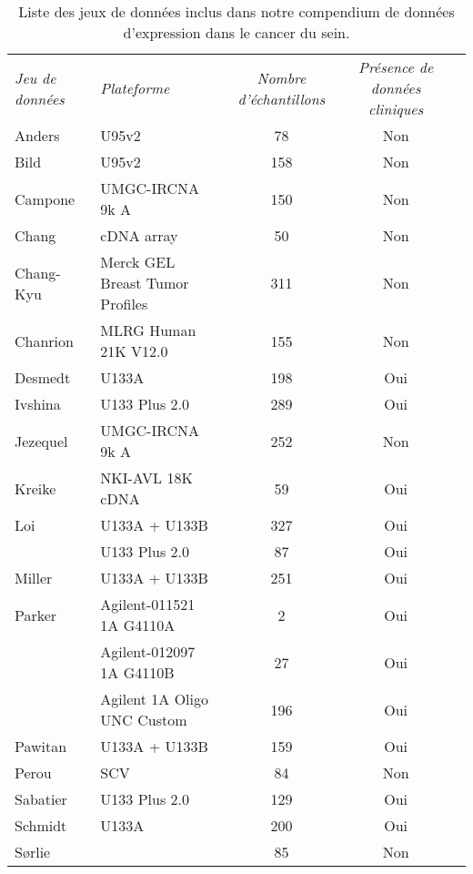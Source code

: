 			\begin{table}
				\begin{center}
					\caption{Liste des jeux de données inclus dans notre compendium de données d'expression dans le cancer du sein.}
					\begin{tabular}{llccc}
						\toprule
						\multirow{3}{3cm}{\emph{Jeu de données}} & \multirow{3}{2cm}{\emph{Plateforme}} & \multirow{3}{2cm}{\centering\emph{Nombre d'échantillons}} & \multirow{3}{2cm}{\centering\emph{Présence de données cliniques}} \\
										&									&		&		\\
										&									&		&		\\
						\midrule
						Anders			& U95v2								& 78	& Non	\\
						Bild			& U95v2								& 158	& Non	\\
						Campone			& UMGC-IRCNA 9k A					& 150	& Non	\\
						Chang			& cDNA array						& 50	& Non	\\
						Chang-Kyu		& Merck GEL Breast Tumor Profiles	& 311	& Non	\\
						Chanrion		& MLRG Human 21K V12.0				& 155	& Non	\\
						Desmedt			& U133A								& 198	& Oui	\\
						Ivshina			& U133 Plus 2.0						& 289	& Oui	\\
						Jezequel		& UMGC-IRCNA 9k A					& 252	& Non	\\
						Kreike			& NKI-AVL 18K cDNA					& 59	& Oui	\\
						Loi				& U133A + U133B						& 327	& Oui	\\
										& U133 Plus 2.0						& 87	& Oui	\\
						Miller			& U133A + U133B						& 251	& Oui	\\
						Parker			& Agilent-011521 1A G4110A			& 2		& Oui	\\
										& Agilent-012097 1A G4110B			& 27	& Oui	\\
										& Agilent 1A Oligo UNC Custom		& 196	& Oui	\\
						Pawitan			& U133A + U133B						& 159	& Oui	\\
						Perou			& SCV								& 84	& Non	\\
						Sabatier		& U133 Plus 2.0						& 129	& Oui	\\
						Schmidt			& U133A								& 200	& Oui	\\
						S{\o}rlie		&									& 85	& Non	\\

\end{tabular}
\end{center}
\end{table}
